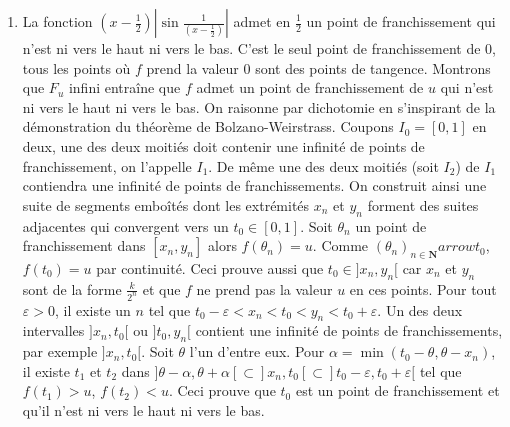 \begin{enumerate}
  \item La fonction $(x-\frac{1}{2})| \sin \frac{1}{(x-\frac{1}{2})}| $ admet en $\frac{1}{2}$ un point de franchissement qui n'est ni vers le haut ni vers
le bas. C'est le seul point de franchissement de $0$, tous les points o{\`u} $f$ prend la valeur 0 sont des points de tangence.\newline
Montrons que $F_{u}$ infini entra\^{i}ne que $f$ admet un point de franchissement de $u$ qui n'est ni vers le haut ni vers le bas.
On raisonne par dichotomie en s'inspirant de la d{\'e}monstration du th{\'e}or{\`e}me de Bolzano-Weirstrass.\newline
Coupons $I_{0}=[ 0,1] $ en deux, une des deux moiti{\'e}s doit contenir une infinit{\'e} de points de franchissement, on l'appelle $I_{1}$.
De m{\^e}me une des deux moiti{\'e}s (soit $I_{2}$) de $I_{1}$ contiendra une infinit{\'e} de points de franchissements.
On construit ainsi une suite de segments embo\^{i}t{\'e}s dont les extr{\'e}mit{\'e}s $x_{n}$ et $y_{n}$ forment des suites adjacentes qui convergent vers un
$t_{0}\in [0,1] $.\newline
Soit $\theta _{n}$ un point de franchissement dans $[ x_{n},y_{n}] $ alors $f(\theta _{n})=u$.
Comme $(\theta _{n})_{n\in \mathbf{N}}arrow t_{0}$, $f(t_{0})=u$ par continuit{\'e}.
Ceci prouve aussi que $t_{0}\in ] x_{n},y_{n}[ $ car $x_{n}$ et $y_{n}$ sont de la forme $\frac{k}{2^{n}}$ et que $f$ ne prend pas la valeur $u$ en ces points.\newline
Pour tout $\varepsilon >0$, il existe un $n$ tel que $t_{0}-\varepsilon <x_{n}<t_{0}<y_{n}<t_{0}+\varepsilon $.
Un des deux intervalles $]x_{n},t_{0}[ $ ou $] t_{0},y_{n}[ $ contient une infinit{\'e} de points de franchissements, par exemple $] x_{n},t_{0}[$.
Soit $\theta $ l'un d'entre eux.\newline
Pour $\alpha =\min (t_{0}-\theta ,\theta -x_{n})$, il existe $t_{1}$ et $t_{2}$ dans
$] \theta -\alpha ,\theta +\alpha [ \subset ] x_{n},t_{0}[ \subset ] t_{0}-\varepsilon ,t_{0}+\varepsilon [ $
tel que $f(t_{1})>u$, $f(t_{2})<u$.
Ceci prouve que $t_{0}$ est un point de franchissement et qu'il n'est ni vers le haut ni vers le bas.
\end{enumerate}
